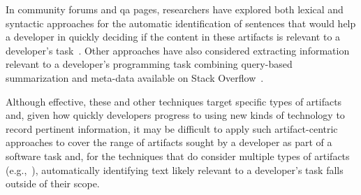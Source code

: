 In community forums and \acs{qa} pages, researchers have explored both lexical 
and syntactic approaches for the automatic identification of sentences that would 
help a developer in quickly deciding if the content in these artifacts is relevant to 
a developer's task~\cite{nadi2020}. Other approaches have also considered 
extracting information relevant to a developer's 
programming task combining query-based summarization 
and meta-data available on Stack Overflow~\cite{Xu2017, silva2019}.



Although effective, these and other techniques target specific
types of artifacts and, given 
how quickly developers progress to using new kinds of technology to
record pertinent information,
it may be difficult to apply such artifact-centric approaches to cover the range of
artifacts sought by a developer as part of a software task
and, for the techniques that do consider multiple types of artifacts (e.g.,~\cite{Ponzanelli2017}),
automatically identifying text likely relevant to a developer's task 
falls outside of their scope.


